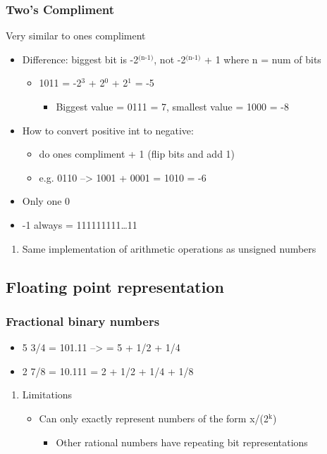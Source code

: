 \documentclass[11pt]{article}
\begin{document}
\subsubsection{Two's Compliment}
\label{sec-4-2-3}
Very similar to ones compliment 
\begin{itemize}
\item Difference: biggest bit is -2$^{\text{(n-1)}}$, not -2$^{\text{(n-1)}}$  + 1 where n = num of bits
\begin{itemize}
\item 1011 = -2$^{\text{3}}$ + 2$^{\text{0}}$ + 2$^{\text{1}}$ = -5
\begin{itemize}
\item Biggest value = 0111 = 7, smallest value = 1000 = -8
\end{itemize}
\end{itemize}
\item How to convert positive int to negative:
\begin{itemize}
\item do ones compliment + 1 (flip bits and add 1)
\item e.g. 0110 --> 1001 + 0001 = 1010 = -6
\end{itemize}
\item Only one 0
\item -1 always = 111111111\ldots{}11
\end{itemize}
\begin{enumerate}
\item Same implementation of arithmetic operations as unsigned numbers
\label{sec-4-2-3-1}
\end{enumerate}
\subsection{Floating point representation}
\label{sec-4-3}
\subsubsection{Fractional binary numbers}
\label{sec-4-3-1}
\begin{itemize}
\item 5 3/4 = 101.11 --> = 5 + 1/2 + 1/4
\item 2 7/8 = 10.111 = 2 + 1/2 + 1/4 + 1/8
\end{itemize}
\begin{enumerate}
\item Limitations
\label{sec-4-3-1-1}
\begin{itemize}
\item Can only exactly represent numbers of the form x/(2$^{\text{k}}$)
\begin{itemize}
\item Other rational numbers have repeating bit representations
\end{itemize}
\end{itemize}
\end{enumerate}
\end{document}
